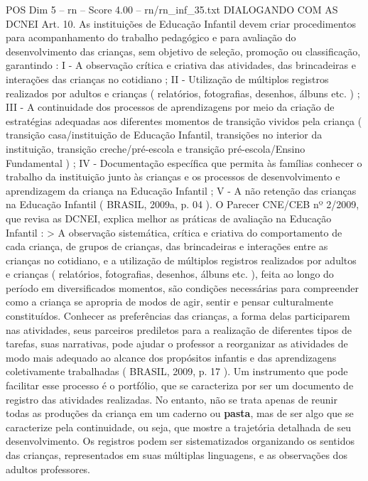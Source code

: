 \begin{textsample}{POS Dim 5 – rn – Score 4.00 – rn/rn\_inf\_35.txt}  \label{ex:f5_pos_149}
DIALOGANDO COM AS DCNEI Art. 10.
As instituições de Educação Infantil devem criar procedimentos para acompanhamento do trabalho pedagógico e para avaliação do desenvolvimento das crianças, sem objetivo de seleção, promoção ou classificação, garantindo : I - A observação crítica e criativa das atividades, das brincadeiras e interações das crianças no cotidiano ; II - Utilização de múltiplos registros realizados por adultos e crianças ( relatórios, fotografias, desenhos, álbuns etc. ) ; III - A continuidade dos processos de aprendizagens por meio da criação de estratégias adequadas aos diferentes momentos de transição vividos pela criança ( transição casa/instituição de Educação Infantil, transições no interior da instituição, transição creche/pré-escola e transição pré-escola/Ensino Fundamental ) ; IV - Documentação específica que permita às famílias conhecer o trabalho da instituição junto às crianças e os processos de desenvolvimento e aprendizagem da criança na Educação Infantil ; V - A não retenção das crianças na Educação Infantil ( BRASIL, 2009a, p. 04 ).
O Parecer CNE/CEB nº 2/2009, que revisa as DCNEI, explica melhor as práticas de avaliação na Educação Infantil : > A observação sistemática, crítica e criativa do comportamento de cada criança, de grupos de crianças, das brincadeiras e interações entre as crianças no cotidiano, e a utilização de múltiplos registros realizados por adultos e crianças ( relatórios, fotografias, desenhos, álbuns etc. ), feita ao longo do período em diversificados momentos, são condições necessárias para compreender como a criança se apropria de modos de agir, sentir e pensar culturalmente constituídos.
Conhecer as preferências das crianças, a forma delas participarem nas atividades, seus parceiros prediletos para a realização de diferentes tipos de tarefas, suas narrativas, pode ajudar o professor a reorganizar as atividades de modo mais adequado ao alcance dos propósitos infantis e das aprendizagens coletivamente trabalhadas ( BRASIL, 2009, p. 17 ).
Um instrumento que pode facilitar esse processo é o portfólio, que se caracteriza por ser um documento de registro das atividades realizadas.
No entanto, não se trata apenas de reunir todas as produções da criança em um caderno ou \textbf{pasta}, mas de ser algo que se caracterize pela continuidade, ou seja, que mostre a trajetória detalhada de seu desenvolvimento.
Os registros podem ser sistematizados organizando os sentidos das crianças, representados em suas múltiplas linguagens, e as observações dos adultos professores.

\end{textsample}

